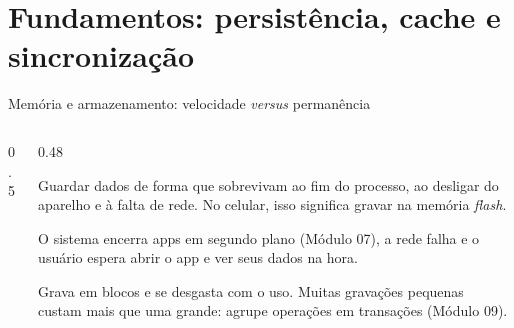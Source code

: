 \section{Fundamentos: persistência, cache e sincronização}

\begin{frame}{Memória e armazenamento: velocidade \emph{versus} permanência}
  \begin{columns}[c]
    \begin{column}{0.5\textwidth}
      \centering
    \end{column}
    \begin{column}{0.48\textwidth}
      \begin{definicao}[Persistência]
        Guardar dados de forma que sobrevivam ao fim do processo, ao desligar do aparelho e à falta de rede. No celular, isso significa gravar na memória \emph{flash}.
      \end{definicao}
      \begin{conceito}
        O sistema encerra apps em segundo plano (Módulo 07), a rede falha e o usuário espera abrir o app e ver seus dados na hora.
      \end{conceito}
      \begin{pordentro}
        Grava em blocos e se desgasta com o uso. Muitas gravações pequenas custam mais que uma grande: agrupe operações em transações (Módulo 09).
      \end{pordentro}
    \end{column}
  \end{columns}
\end{frame}

